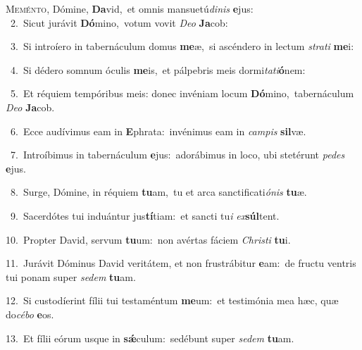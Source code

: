 \lettrine{\initial\textcolor{\initialcolor}{M}}{eménto,} Dómine, \textbf{Da}\-vid,~\star et omnis mansuetú\-\textit{di}\-\textit{nis} \textbf{e}\-jus:\\
{\numbfont\textcolor{\numbcolor}{~2.}}~Sicut jurávit \textbf{Dó}\-mino,~\star votum vovit \textit{De}\-\textit{o} \textbf{Ja}\-cob:\par
{\numbfont\textcolor{\numbcolor}{~3.}}~Si introíero in tabernáculum domus \textbf{me}\-æ,~\star si ascéndero in lectum \textit{stra}\-\textit{ti} \textbf{me}\-i:\par
{\numbfont\textcolor{\numbcolor}{~4.}}~Si dédero somnum óculis \textbf{me}\-is,~\star et pálpebris meis dormi\-\textit{ta}\-\textit{ti}\textbf{ó}nem:\par
{\numbfont\textcolor{\numbcolor}{~5.}}~Et réquiem tempóribus meis: donec invéniam locum \textbf{Dó}\-mino,~\star tabernáculum \textit{De}\-\textit{o} \textbf{Ja}\-cob.\par
{\numbfont\textcolor{\numbcolor}{~6.}}~Ecce audívimus eam in \textbf{E}\-phrata:~\star invénimus eam in \textit{cam}\-\textit{pis} \textbf{sil}\-væ.\par
{\numbfont\textcolor{\numbcolor}{~7.}}~Introíbimus in tabernáculum \textbf{e}\-jus:~\star adorábimus in loco, ubi stetérunt \textit{pe}\-\textit{des} \textbf{e}\-jus.\par
{\numbfont\textcolor{\numbcolor}{~8.}}~Surge, Dómine, in réquiem \textbf{tu}\-am,~\star tu et arca sanctificati\-\textit{ó}\-\textit{nis} \textbf{tu}\-æ.\par
{\numbfont\textcolor{\numbcolor}{~9.}}~Sacerdótes tui induántur jus\-\textbf{tí}\-tiam:~\star et sancti tu\textit{i} \textit{ex}\-\textbf{súl}tent.\par
{\numbfont\textcolor{\numbcolor}{10.}}~Propter David, servum \textbf{tu}\-um:~\star non avértas fáciem \textit{Chris}\-\textit{ti} \textbf{tu}\-i.\par
{\numbfont\textcolor{\numbcolor}{11.}}~Jurávit Dóminus David veritátem, et non frustrábitur \textbf{e}\-am:~\star de fructu ventris tui ponam super \textit{se}\-\textit{dem} \textbf{tu}\-am.\par
{\numbfont\textcolor{\numbcolor}{12.}}~Si custodíerint fílii tui testaméntum \textbf{me}\-um:~\star et testimónia mea hæc, quæ do\-\textit{cé}\-\textit{bo} \textbf{e}\-os.\par
{\numbfont\textcolor{\numbcolor}{13.}}~Et fílii eórum usque in \textbf{sǽ}\-culum:~\star sedébunt super \textit{se}\-\textit{dem} \textbf{tu}\-am.\par
